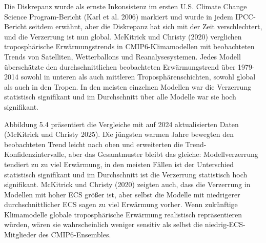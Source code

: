 \documentclass[12pt,paper=a4,DIV=12,parskip=never,chapterprefix=false,headings=standardclasses]{scrreprt}
\begin{document}
Die Diskrepanz wurde als ernste Inkonsistenz im ersten U.S. Climate Change Science Program-Bericht (Karl et al. 2006) markiert und wurde in jedem IPCC-Bericht seitdem erwähnt, aber die Diskrepanz hat sich mit der Zeit verschlechtert, und die Verzerrung ist nun global. McKitrick und Christy (2020) verglichen troposphärische Erwärmungstrends in CMIP6-Klimamodellen mit beobachteten Trends von Satelliten, Wetterballons und Reanalysesystemen. Jedes Modell überschätzte den durchschnittlichen beobachteten Erwärmungstrend über 1979-2014 sowohl in unteren als auch mittleren Troposphärenschichten, sowohl global als auch in den Tropen. In den meisten einzelnen Modellen war die Verzerrung statistisch signifikant und im Durchschnitt über alle Modelle war sie hoch signifikant.

Abbildung 5.4 präsentiert die Vergleiche mit auf 2024 aktualisierten Daten (McKitrick und Christy 2025). Die jüngsten warmen Jahre bewegten den beobachteten Trend leicht nach oben und erweiterten die Trend-Konfidenzintervalle, aber das Gesamtmuster bleibt das gleiche: Modellverzerrung tendiert zu zu viel Erwärmung, in den meisten Fällen ist der Unterschied statistisch signifikant und im Durchschnitt ist die Verzerrung statistisch hoch signifikant. McKitrick und Christy (2020) zeigten auch, dass die Verzerrung in Modellen mit hoher ECS größer ist, aber selbst die Modelle mit niedrigerer durchschnittlicher ECS sagen zu viel Erwärmung vorher. Wenn zukünftige Klimamodelle globale troposphärische Erwärmung realistisch repräsentieren würden, wären sie wahrscheinlich weniger sensitiv als selbst die niedrig-ECS-Mitglieder des CMIP6-Ensembles.
\end{document}
